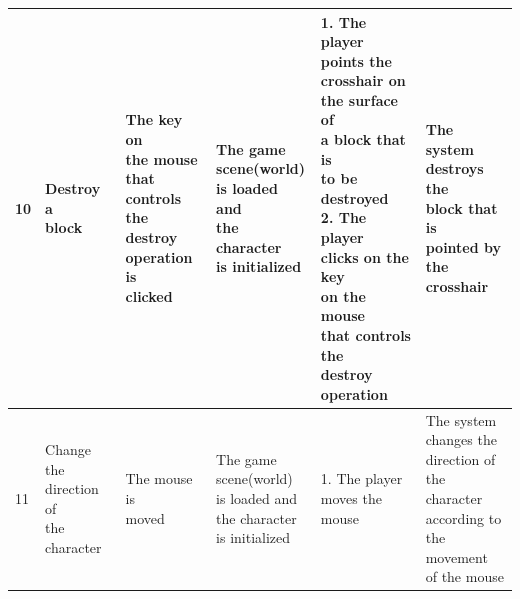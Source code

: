 \documentclass[12pt, titlepage]{article}
\begin{document}
\begin{center}
\begin{longtable}[!bpht]{|m{0.9cm}|m{2.6cm}|m{2.6cm}|m{2.7cm}|m{3.2cm}|m{2.7cm}|}
10 & \makecell[ml]{Destroy a\\ block} & \makecell[ml]{The key on\\ the mouse\\ that controls\\ the destroy\\ operation is\\ clicked} & \makecell[ml]{The game\\ scene(world)\\ is loaded and\\ the character\\ is initialized} & \makecell[ml]{1. The player\\ points the\\ crosshair on\\ the surface of\\ a block that is\\ to be destroyed\\ 2. The player\\ clicks on the key\\ on the mouse\\ that controls the\\ destroy operation} & \makecell[ml]{The system\\ destroys the\\ block that is\\ pointed by the\\ crosshair}\\\hline

11 & \makecell[ml]{Change the\\ direction of\\ the character} & \makecell[ml]{The mouse is\\ moved} & \makecell[ml]{The game\\ scene(world)\\ is loaded and\\ the character\\ is initialized} & \makecell[ml]{1. The player\\ moves the mouse} & \makecell[ml]{The system\\ changes the\\ direction of\\ the character\\ according to\\ the movement\\ of the mouse}\\\hline


\end{longtable}
\end{center}
\end{document}
